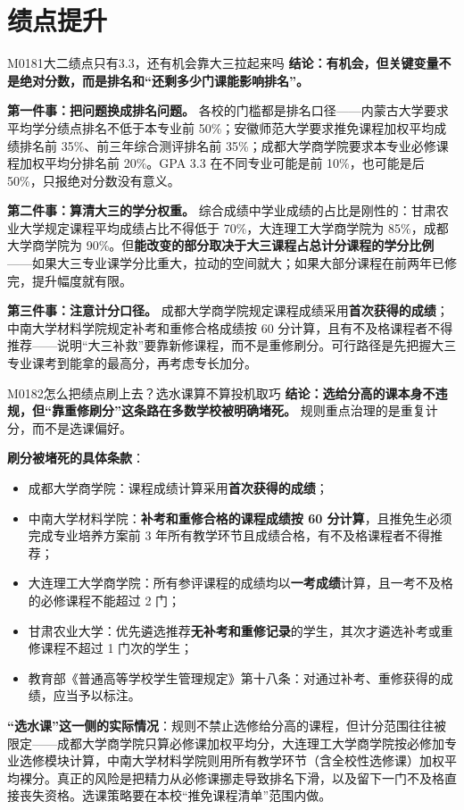 \section{绩点提升}
\begin{qa}{M0181}{大二绩点只有3.3，还有机会靠大三拉起来吗}
\textbf{结论：有机会，但关键变量不是绝对分数，而是排名和“还剩多少门课能影响排名”。}

\textbf{第一件事：把问题换成排名问题。} 各校的门槛都是排名口径——内蒙古大学要求平均学分绩点排名不低于本专业前 50\%；安徽师范大学要求推免课程加权平均成绩排名前 35\%、前三年综合测评排名前 35\%；成都大学商学院要求本专业必修课程加权平均分排名前 20\%。GPA 3.3 在不同专业可能是前 10\%，也可能是后 50\%，只报绝对分数没有意义。

\textbf{第二件事：算清大三的学分权重。} 综合成绩中学业成绩的占比是刚性的：甘肃农业大学规定课程平均成绩占比不得低于 70\%，大连理工大学商学院为 85\%，成都大学商学院为 90\%。但\textbf{能改变的部分取决于大三课程占总计分课程的学分比例}——如果大三专业课学分比重大，拉动的空间就大；如果大部分课程在前两年已修完，提升幅度就有限。

\textbf{第三件事：注意计分口径。} 成都大学商学院规定课程成绩采用\textbf{首次获得的成绩}；中南大学材料学院规定补考和重修合格成绩按 60 分计算，且有不及格课程者不得推荐——说明“大三补救”要靠新修课程，而不是重修刷分。可行路径是先把握大三专业课考到能拿的最高分，再考虑专长加分。
\end{qa}

\begin{qa}{M0182}{怎么把绩点刷上去？选水课算不算投机取巧}
\textbf{结论：选给分高的课本身不违规，但“靠重修刷分”这条路在多数学校被明确堵死。} 规则重点治理的是重复计分，而不是选课偏好。

\textbf{刷分被堵死的具体条款}：
\begin{itemize}
  \item 成都大学商学院：课程成绩计算采用\textbf{首次获得的成绩}；
  \item 中南大学材料学院：\textbf{补考和重修合格的课程成绩按 60 分计算}，且推免生必须完成专业培养方案前 3 年所有教学环节且成绩合格，有不及格课程者不得推荐；
  \item 大连理工大学商学院：所有参评课程的成绩均以\textbf{一考成绩}计算，且一考不及格的必修课程不能超过 2 门；
  \item 甘肃农业大学：优先遴选推荐\textbf{无补考和重修记录}的学生，其次才遴选补考或重修课程不超过 1 门次的学生；
  \item 教育部《普通高等学校学生管理规定》第十八条：对通过补考、重修获得的成绩，应当予以标注。
\end{itemize}

\textbf{“选水课”这一侧的实际情况}：规则不禁止选修给分高的课程，但计分范围往往被限定——成都大学商学院只算必修课加权平均分，大连理工大学商学院按必修加专业选修模块计算，中南大学材料学院则用所有教学环节（含全校性选修课）加权平均裸分。真正的风险是把精力从必修课挪走导致排名下滑，以及留下一门不及格直接丧失资格。选课策略要在本校“推免课程清单”范围内做。
\end{qa}

